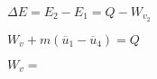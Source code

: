 \( \Delta E = E_2 - E_1 = Q - W_{v_2} \)  

\( W_v + m (\overline{u}_1 - \overline{u}_4) = Q \)  

\( W_v = \)